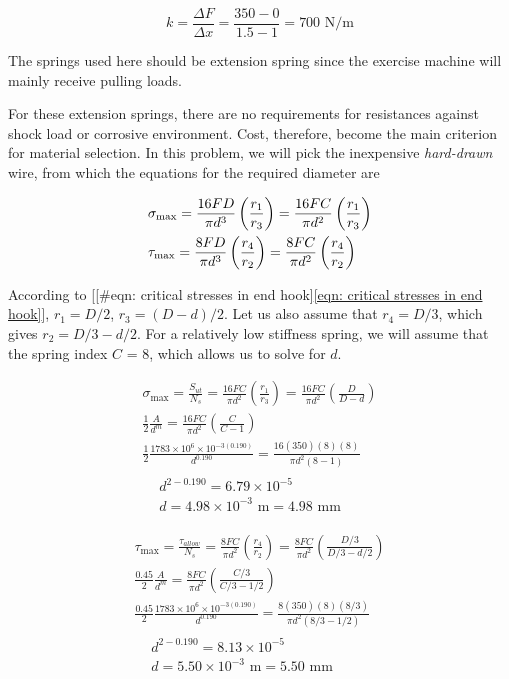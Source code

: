 \documentclass[a4paper,openany,12pt]{book}
\begin{document}
{{\begin{enumerate}
$$k = \frac{\Delta F}{\Delta x} = \frac{350 - 0}{1.5 - 1} = 700\text{ N/m}$$

The springs used here should be extension spring since the exercise
machine will mainly receive pulling loads.

For these extension springs, there are no requirements for resistances
against shock load or corrosive environment. Cost, therefore, become the
main criterion for material selection. In this problem, we will pick the
inexpensive \emph{hard-drawn} wire, from which the equations for the required
diameter are

$$\begin{gathered}
  \sigma_{\max} = \frac{16FD}{\pi d^3}\left( \frac{r_1}{r_3} \right) = \frac{16FC}{\pi d^2}\left( \frac{r_1}{r_3} \right) \hfill \\
  \tau_{\max} = \frac{8FD}{\pi d^3}\left( \frac{r_4}{r_2} \right) = \frac{8FC}{\pi d^2}\left( \frac{r_4}{r_2} \right) \hfill \\ 
\end{gathered}$$

According to
[[\#eqn: critical stresses in end hook]\ref{eqn: critical stresses in end hook}],
\(r_1 = D / 2\), \(r_3 = (D - d) / 2\). Let us also assume that
\(r_4 = D / 3\), which gives \(r_2 = D / 3 - d / 2\). For a relatively low
stiffness spring, we will assume that the spring index \(C\) = 8, which
allows us to solve for \(d\).

$$\begin{gathered}
  \sigma_{\max} = \frac{S_{ut}}{N_s} = \frac{16FC}{\pi d^2}\left( \frac{r_1}{r_3} \right) = \frac{16FC}{\pi d^2}\left( \frac{D}{D - d} \right) \\
  \frac{1}{2}\frac{A}{d^m} = \frac{16FC}{\pi d^2}\left( \frac{C}{C - 1} \right) \\ 
  \frac{1}{2}\frac{1783 \times 10^6 \times 10^{-3(0.190)}}{d^{0.190}} = \frac{16(350)(8)(8)}{\pi d^2(8 - 1)} \\
  \begin{aligned}
  &d^{2-0.190} = 6.79 \times 10^{-5} \\ 
  &d = 4.98 \times 10^{-3} \text{ m} = 4.98\text{ mm}
  \end{aligned}\end{gathered}$$

$$\begin{gathered}
  \tau_{\max} = \frac{\tau_{allow}}{N_s} = \frac{8FC}{\pi d^2}\left( \frac{r_4}{r_2} \right) = \frac{8FC}{\pi d^2}\left( \frac{D/3}{D/3 - d/2} \right) \\ 
  \frac{0.45}{2}\frac{A}{d^m} = \frac{8FC}{\pi d^2}\left( \frac{C/3}{C/3 - 1/2} \right) \\ 
  \frac{0.45}{2}\frac{1783 \times 10^6 \times 10^{-3(0.190)}}{d^{0.190}} = \frac{8(350)(8)(8/3)}{\pi d^2(8/3 - 1/2)} \\
  \begin{aligned}
  &d^{2-0.190} = 8.13 \times 10^{-5} \\ 
  &d = 5.50 \times 10^{-3}\text{ m} = 5.50 \text{ mm}
  \end{aligned}\end{gathered}$$


\end{enumerate}}}
\end{document}
